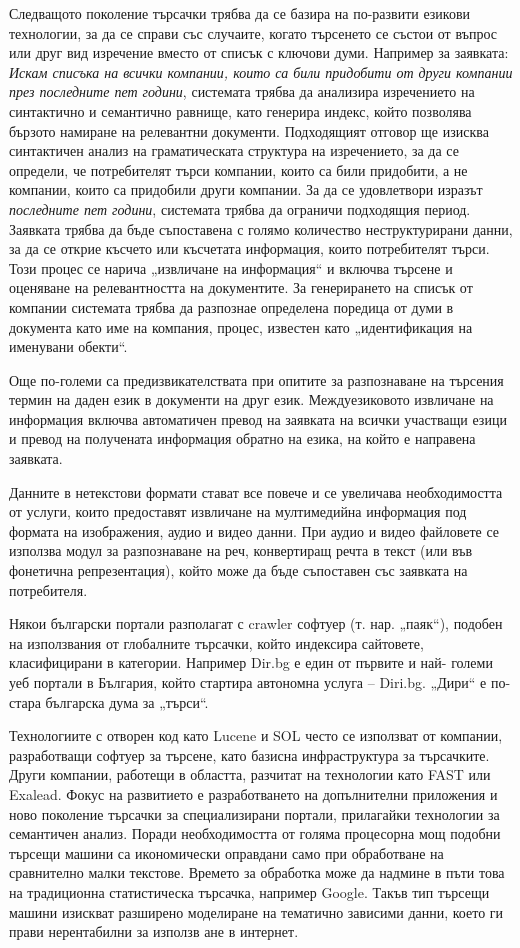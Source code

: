 \documentclass[]{../../metanetpaper}
\begin{document}
\begin{multicols}{2}
Следващото поколение търсачки трябва да се базира на
 по-развити езикови технологии, за да се справи със случаите, когато търсенето се състои от въпрос или друг вид изречение вместо от списък с ключови думи. 
 Например за заявката: \textit{Искам списъка на всички компании, които
 са били придобити от други компании през последните пет
 години}, системата трябва да анализира  изречението на синтактично и семантично равнище, като генерира индекс, който позволява бързото намиране на релевантни документи. Подходящият отговор ще изисква синтактичен анализ на граматическата структура на изречението, за да се определи, че потребителят търси компании, които са били придобити, а не компании, които са придобили
 други компании. За да се удовлетвори изразът \textit{последните пет години}, системата трябва да ограничи подходящия период. Заявката трябва да бъде съпоставена с голямо количество неструктурирани данни, за да се
 открие късчето или късчетата информация, които потребителят търси. Този процес се нарича „извличане на информация“ и включва търсене и оценяване на релевантността на  документите. За генерирането на списък от компании системата трябва да разпознае определена поредица от думи
 в документа като име на компания, процес, известен като „идентификация на
 именувани обекти“.

Още по-големи са предизвикателствата при опитите за разпознаване на търсения термин на даден език в документи на друг език. Междуезиковото извличане на информация включва автоматичен превод на заявката
 на всички участващи езици и превод на получената информация обратно на езика, на който е направена заявката.

Данните в нетекстови формати стават все повече и се увеличава необходимостта от услуги, които предоставят извличане на мултимедийна информация под
 формата на изображения, аудио и видео данни. При аудио и видео файловете се използва модул за разпознаване
 на реч, конвертиращ речта в текст (или във
 фонетична репрезентация), който може да бъде
 съпоставен със заявката на потребителя.
 
Някои български портали разполагат с crawler софтуер (т. нар.
 „паяк“), подобен на използвания от глобалните
 търсачки, който индексира сайтовете, класифицирани в
 категории. Например Dir.bg е един от първите и най-
големи уеб портали в България, който стартира
 автономна услуга – Diri.bg. „Дири“ е по-стара българска дума за „търси“. 

Технологиите с отворен код като
 Lucene и SOL често се използват от компании,
 разработващи софтуер за търсене, като базисна
 инфраструктура за търсачките. Други компании,
 работещи в областта, разчитат на технологии като FAST или Exalead.
Фокус на развитието е разработването на допълнителни приложения и ново поколение търсачки за специализирани портали, прилагайки технологии за семантичен анализ. Поради необходимостта от голяма процесорна мощ подобни търсещи машини са икономически оправдани само при обработване на сравнително малки текстове. Времето за обработка може да надмине в пъти това на традиционна статистическа търсачка, например Google. Такъв тип търсещи машини изискват разширено моделиране на тематично зависими данни, което ги прави нерентабилни за използв
 ане в интернет.


\end{multicols}
\end{document}
